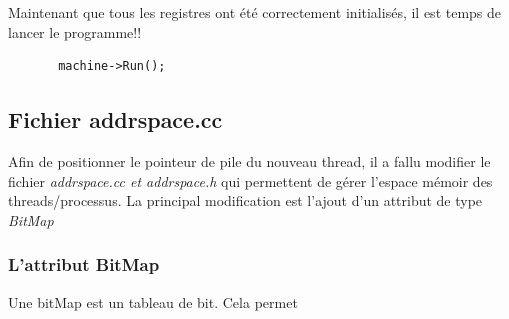 \documentclass[a4paper,10pt]{article}
\begin{document}
      Maintenant que tous les registres ont été correctement initialisés, il est temps de lancer le programme!!
      \begin{lstlisting}
       machine->Run();
      \end{lstlisting}
  
 \subsection{Fichier addrspace.cc}
  Afin de positionner le pointeur de pile du nouveau thread, il a fallu modifier le fichier \emph{addrspace.cc et addrspace.h} qui permettent de gérer 
  l'espace mémoir des threads/processus. La principal modification est l'ajout d'un attribut de type \emph{BitMap}
  
  \subsubsection*{L'attribut BitMap}
    Une bitMap est un tableau de bit. Cela permet 
\end{document}
